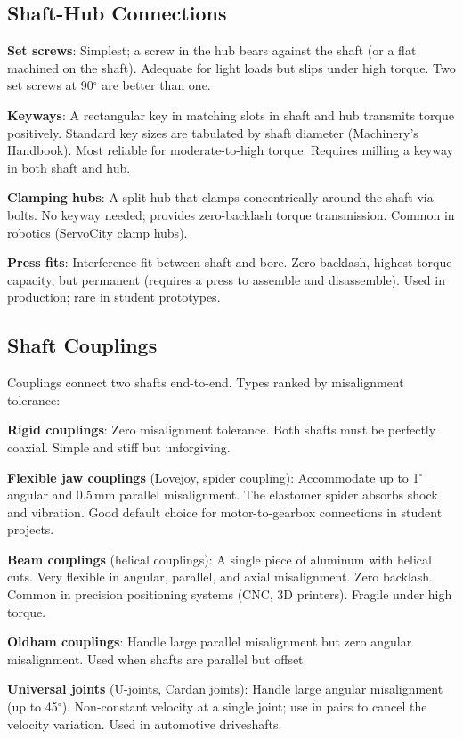 \documentclass[11pt,letterpaper,twoside,openany]{book}
\begin{document}
\subsection{Shaft-Hub Connections}
\textbf{Set screws}: Simplest; a screw in the hub bears against the shaft (or a flat machined on the shaft). Adequate for light loads but slips under high torque. Two set screws at 90\ensuremath{{}^{\circ}}{} are better than one.

\textbf{Keyways}: A rectangular key in matching slots in shaft and hub transmits torque positively. Standard key sizes are tabulated by shaft diameter (Machinery's Handbook). Most reliable for moderate-to-high torque. Requires milling a keyway in both shaft and hub.

\textbf{Clamping hubs}: A split hub that clamps concentrically around the shaft via bolts. No keyway needed; provides zero-backlash torque transmission. Common in robotics (ServoCity clamp hubs).

\textbf{Press fits}: Interference fit between shaft and bore. Zero backlash, highest torque capacity, but permanent (requires a press to assemble and disassemble). Used in production; rare in student prototypes.

\subsection{Shaft Couplings}
Couplings connect two shafts end-to-end. Types ranked by misalignment tolerance:

\textbf{Rigid couplings}: Zero misalignment tolerance. Both shafts must be perfectly coaxial. Simple and stiff but unforgiving.

\textbf{Flexible jaw couplings} (Lovejoy, spider coupling): Accommodate up to 1\ensuremath{{}^{\circ}}{} angular and 0.5\,mm parallel misalignment. The elastomer spider absorbs shock and vibration. Good default choice for motor-to-gearbox connections in student projects.

\textbf{Beam couplings} (helical couplings): A single piece of aluminum with helical cuts. Very flexible in angular, parallel, and axial misalignment. Zero backlash. Common in precision positioning systems (CNC, 3D printers). Fragile under high torque.

\textbf{Oldham couplings}: Handle large parallel misalignment but zero angular misalignment. Used when shafts are parallel but offset.

\textbf{Universal joints} (U-joints, Cardan joints): Handle large angular misalignment (up to 45\ensuremath{{}^{\circ}}). Non-constant velocity at a single joint; use in pairs to cancel the velocity variation. Used in automotive driveshafts.
\end{document}

